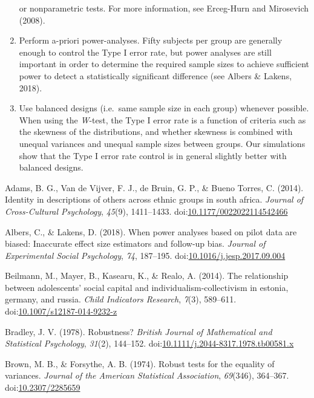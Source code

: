 \documentclass[man,floatsintext]{apa6}
\begin{document}
\begin{enumerate}
  or nonparametric tests. For more information, see Erceg-Hurn and
  Mirosevich (2008).
\item
  Perform a-priori power-analyses. Fifty subjects per group are
  generally enough to control the Type I error rate, but power analyses
  are still important in order to determine the required sample sizes to
  achieve sufficient power to detect a statistically significant
  difference (see Albers \& Lakens, 2018).
\item
  Use balanced designs (i.e.~same sample size in each group) whenever
  possible. When using the \emph{W}-test, the Type I error rate is a
  function of criteria such as the skewness of the distributions, and
  whether skewness is combined with unequal variances and unequal sample
  sizes between groups. Our simulations show that the Type I error rate
  control is in general slightly better with balanced designs.
\end{enumerate}

\hypertarget{refs}{}
\hypertarget{ref-Adams_et_al_2014}{}
Adams, B. G., Van de Vijver, F. J., de Bruin, G. P., \& Bueno Torres, C.
(2014). Identity in descriptions of others across ethnic groups in south
africa. \emph{Journal of Cross-Cultural Psychology}, \emph{45}(9),
1411--1433.
doi:\href{https://doi.org/10.1177/0022022114542466}{10.1177/0022022114542466}

\hypertarget{ref-Albers_and_Lakens_2018}{}
Albers, C., \& Lakens, D. (2018). When power analyses based on pilot
data are biased: Inaccurate effect size estimators and follow-up bias.
\emph{Journal of Experimental Social Psychology}, \emph{74}, 187--195.
doi:\href{https://doi.org/10.1016/j.jesp.2017.09.004}{10.1016/j.jesp.2017.09.004}

\hypertarget{ref-Beilmann_et_al_2014}{}
Beilmann, M., Mayer, B., Kasearu, K., \& Realo, A. (2014). The
relationship between adolescents' social capital and
individualism-collectivism in estonia, germany, and russia. \emph{Child
Indicators Research}, \emph{7}(3), 589--611.
doi:\href{https://doi.org/10.1007/s12187-014-9232-z}{10.1007/s12187-014-9232-z}

\hypertarget{ref-Bradley_1978}{}
Bradley, J. V. (1978). Robustness? \emph{British Journal of Mathematical
and Statistical Psychology}, \emph{31}(2), 144--152.
doi:\href{https://doi.org/10.1111/j.2044-8317.1978.tb00581.x}{10.1111/j.2044-8317.1978.tb00581.x}

\hypertarget{ref-Brown_and_Forsythe_1974}{}
Brown, M. B., \& Forsythe, A. B. (1974). Robust tests for the equality
of variances. \emph{Journal of the American Statistical Association},
\emph{69}(346), 364--367.
doi:\href{https://doi.org/10.2307/2285659}{10.2307/2285659}
\end{document}
